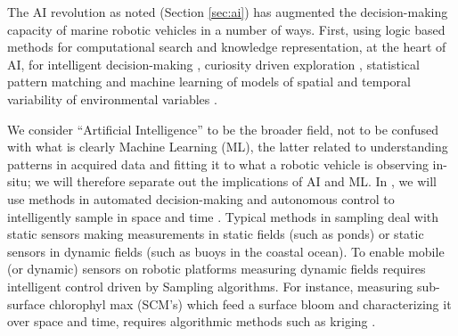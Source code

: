 The AI revolution as noted (Section \ref{sec:ai}) has augmented the
decision-making capacity of marine robotic vehicles in a number of
ways. First, using logic based methods for computational search and
knowledge representation, at the heart of AI, for intelligent
decision-making \cite{ryan10,fossum18,fossum18b}, curiosity driven
exploration \cite{girdhar14}, statistical pattern matching and machine
learning of models of spatial and temporal variability of
environmental variables \cite{fossum19b}.

We consider ``Artificial Intelligence'' to be the broader field, not
to be confused with what is clearly Machine Learning (ML), the latter
related to understanding patterns in acquired data and fitting it to
what a robotic vehicle is observing in-situ; we will therefore
separate out the implications of AI and ML. In \proe, we will use
methods in automated decision-making and autonomous control to
intelligently sample in space and time \cite{graham12}. Typical
methods in sampling deal with static sensors making measurements in
static fields (such as ponds) or static sensors in dynamic fields
(such as buoys in the coastal ocean). To enable mobile (or dynamic)
sensors on robotic platforms measuring dynamic fields requires
intelligent control driven by Sampling algorithms. For instance,
measuring sub-surface chlorophyl max (SCM's) which feed a surface
bloom and characterizing it over space and time, requires algorithmic
methods such as kriging \cite{fossum18}. 





\begin{enumerate} 
\end{enumerate}

